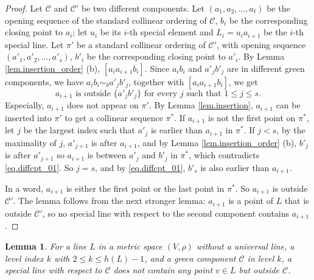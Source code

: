 \documentclass[12pt]{article}
\newtheorem{lem}{Lemma}
\begin{document}
\begin{proof}
Let $\mathcal{C}$ and $\mathcal{C}'$ be two different components. Let $(a_1, a_2, \dots, a_t)$ be the opening sequence of the standard collinear ordering
of $\mathcal{C}$, 
$b_i$ be the corresponding closing point to $a_i$;
let $u_i$ be its $i$-th special element and 
$L_{i} = u_ia_{i+1}$ be the $i$-th special line.
Let $\pi'$ be a standard collinear ordering of $\mathcal{C}'$,
with opening sequence $(a'_1, a'_2, \dots, a'_s)$,
$b'_i$ be the corresponding closing point to $a'_i$.
By Lemma \ref{lem.insertion_order} (b),
$[a_i a_{i+1} b_i]$. Since $a_ib_i$ and $a'_jb'_j$ are in different
green components, we have $a_ib_i \sim_b a'_jb'_j$,
together with $[a_i a_{i+1} b_i]$, we get 
\begin{equation}\label{eq.diffcpt_01}
\mbox{$a_{i+1}$ is outside $\{a'_j b'_j\}$ for every $j$ such that $1\le j \le s$.}
\end{equation}
Especially, $a_{i+1}$ does not appear on $\pi'$.
By Lemma \ref{lem.insertion}, $a_{i+1}$ can be inserted into
$\pi'$  to get a collinear sequence $\pi^*$.
If $a_{i+1}$ is not the first point on $\pi^*$,
let $j$ be the largest index such that $a'_j$ is earlier than $a_{i+1}$ in $\pi^*$.
If $j<s$, by the maximality of $j$, $a'_{j+1}$ is after $a_{i+1}$, and
by Lemma \ref{lem.insertion_order} (b), $b'_{j}$ is after $a'_{j+1}$
so $a_{i+1}$ is between $a'_j$ and $b'_j$ in $\pi^*$, which contradicts  \eqref{eq.diffcpt_01}.
So $j=s$, and by \eqref{eq.diffcpt_01}, $b'_s$ is also earlier than $a_{i+1}$.

In a word, $a_{i+1}$ is either the first point or the last point in $\pi^*$.
So $a_{i+1}$ is outside $\mathcal{C}'$. The lemma follows from the next stronger lemma: $a_{i+1}$ is a point of $L$ that is outside $\mathcal{C}'$, so no special line with respect to the second component contains $a_{i+1}$.
\end{proof}

\begin{lem}\label{lem.distinct_lines_exclusive}
For a line $L$ in a metric space $(V, \rho)$ without a universal line,
a level index $k$ with $2 \le k \le h(L)-1$,
and a green component $\mathcal{C}$ in level $k$,
a special line with respect to $\mathcal{C}$ does not contain any point 
$v \in L$ but outside $\mathcal{C}$. 
\end{lem}
\end{document}
